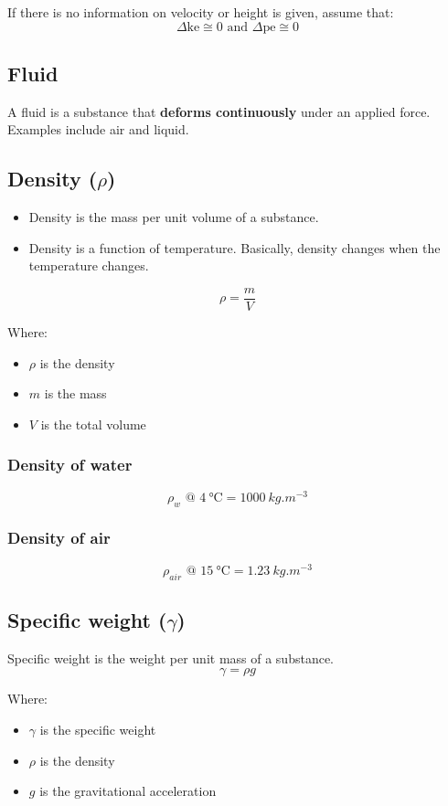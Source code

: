 \documentclass[11pt]{article}
\begin{document}
If there is no information on velocity or height is given, assume that:
\[\Delta \text{ke} \cong 0 \text{ and } \Delta \text{pe} \cong 0\]
\subsection{Fluid}
\label{sec:org37b16a8}
A fluid is a substance that \textbf{deforms continuously} under an applied force. Examples include air and liquid.
\subsection{Density (\(\rho\))}
\label{sec:org8aaa194}
\begin{itemize}
\item Density is the mass per unit volume of a substance.
\item Density is a function of temperature. Basically, density changes when the temperature changes.
\end{itemize}
\[\rho = \frac{m}{V}\]

Where:
\begin{itemize}
\item \(\rho\) is the density
\item \(m\) is the mass
\item \(V\) is the total volume
\end{itemize}
\subsubsection{Density of water}
\label{sec:org6aaa6ce}
\[\rho_w \text{ @ } \qty{4}{\degreeCelsius} = \qty{1000}{kg.m^{-3}}\]
\subsubsection{Density of air}
\label{sec:orgefae228}
\[\rho_{air} \text{ @ } \qty{15}{\degreeCelsius} = \qty{1.23}{kg.m^{-3}}\]
\subsection{Specific weight (\(\gamma\))}
\label{sec:org83e5e90}
Specific weight is the weight per unit mass of a substance.
\[\gamma = \rho g\]

Where:
\begin{itemize}
\item \(\gamma\) is the specific weight
\item \(\rho\) is the density
\item \(g\) is the gravitational acceleration
\end{itemize}
\end{document}
